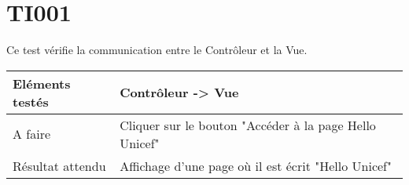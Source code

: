 \section{TI001}
	 Ce test vérifie la communication entre le Contrôleur et la Vue.
	 \begin{center}
     	\begin{tabular}[h]{|p{}|p{}|}
		\hline
			Eléments testés & Contrôleur -> Vue \\\hline
    			A faire & Cliquer sur le bouton "Accéder à la page Hello Unicef" \\\hline
    			Résultat attendu & Affichage d'une page où il est écrit "Hello Unicef" \\\hline
     	\end{tabular}
  	\end{center}	
